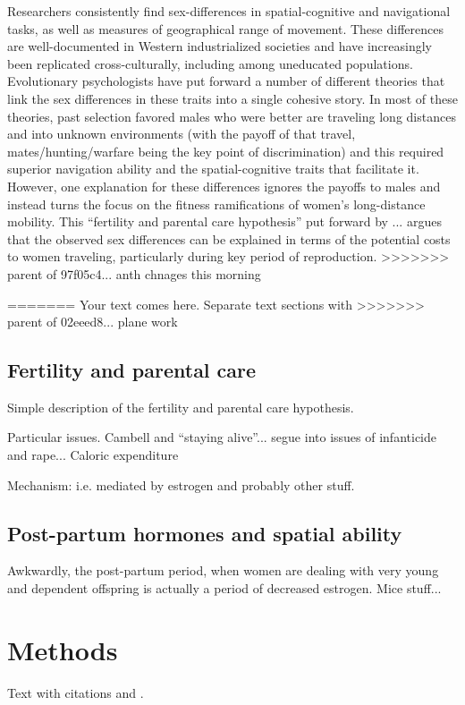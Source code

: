 Researchers consistently find sex-differences in spatial-cognitive and navigational tasks, as well as measures of geographical range of movement.  These differences are well-documented in Western industrialized societies and have increasingly been replicated cross-culturally, including among uneducated populations.  Evolutionary psychologists have put forward a number of different theories that link the sex differences in these traits into a single cohesive story.  In most of these theories, past selection favored males who were better are traveling long distances and into unknown environments (with the payoff of that travel, mates/hunting/warfare being the key point of discrimination) and this required superior navigation ability and the spatial-cognitive traits that facilitate it.  However, one explanation for these differences ignores the payoffs to males and instead turns the focus on the fitness ramifications of women's long-distance mobility.  This ``fertility and parental care hypothesis'' put forward by ... argues that the observed sex differences can be explained in terms of the potential costs to women traveling, particularly during key period of reproduction.
>>>>>>> parent of 97f05c4... anth chnages this morning

=======
Your text comes here. Separate text sections with
>>>>>>> parent of 02eeed8... plane work
	\subsection{Fertility and parental care}
	\label{sec:1.1}
Simple description of the fertility and parental care hypothesis.

Particular issues.  Cambell and ``staying alive''... segue into issues of infanticide and rape...  Caloric expenditure

Mechanism: i.e. mediated by estrogen and probably other stuff.

	\subsection{Post-partum hormones and spatial ability}
	\label{sec:1.2}
Awkwardly, the post-partum period, when women are dealing with very young and dependent offspring is actually a period of decreased estrogen.  Mice stuff...

\section{Methods}
\label{sec:2}
Text with citations \cite{RefB} and \cite{RefJ}.
